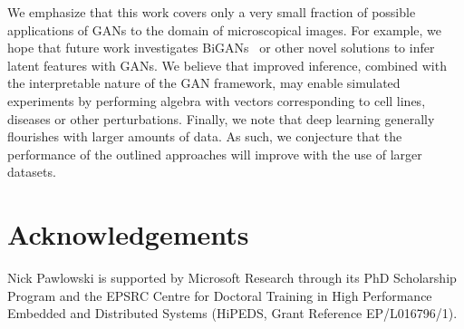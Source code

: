 \documentclass{article}
\begin{document}
We emphasize that this work covers only a very small fraction of possible
applications of GANs to the domain of microscopical images. For example, we hope
that future work investigates BiGANs \cite{donahue2016adversarial} or other
novel solutions to infer latent features with GANs. We believe that improved
inference, combined with the interpretable nature of the GAN framework, may
enable simulated experiments by performing algebra with vectors corresponding to
cell lines, diseases or other perturbations. Finally, we note that deep learning
generally flourishes with larger amounts of data. As such, we conjecture that
the performance of the outlined approaches will improve with the use of larger
datasets.

\section*{Acknowledgements}
Nick Pawlowski is supported by Microsoft Research through its PhD Scholarship
Program and the EPSRC Centre for Doctoral Training in High Performance
Embedded and Distributed Systems (HiPEDS, Grant Reference EP/L016796/1).



\end{document}
